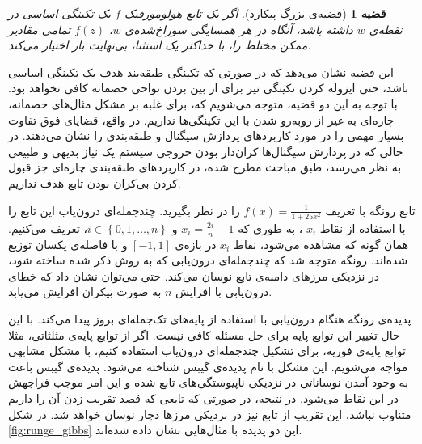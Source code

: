 \documentclass[12pt,onecolumn,a4paper]{article}
\newtheorem{theorem}{قضیه}[section]
\begin{document}
\begin{theorem}[قضیه‌ی بزرگ پیکارد]
    اگر یک تابع هولومورفیک $f$ 
    یک تکینگی اساسی در نقطه‌ی $w$ 
    داشته باشد، آنگاه در هر همسایگی سوراخ‌شده‌ی $w$، $f(z)$ 
    تمامی مقادیر ممکن مختلط را، با حداکثر یک استثنا، بی‌نهایت بار اختیار می‌کند.
\end{theorem}

این قضیه نشان می‌دهد که در صورتی که تکینگی طبقه‌بند هدف یک تکینگی اساسی باشد، حتی ایزوله کردن تکینگی نیز برای از بین بردن نواحی خصمانه کافی نخواهد بود. با توجه به این دو قضیه، متوجه می‌شویم که، برای غلبه بر مشکل مثال‌های خصمانه، چاره‌ای به غیر از روبه‌رو شدن با این تکینگی‌ها نداریم. در واقع، قضایای فوق تفاوت بسیار مهمی را در مورد کاربردهای پردازش سیگنال و طبقه‌بندی را نشان می‌دهند. در حالی که در پردازش سیگنال‌ها کران‌دار بودن خروجی سیستم یک نیاز بدیهی و طبیعی به نظر می‌رسد، طبق مباحث مطرح شده، در کاربردهای طبقه‌بندی چاره‌ای جز قبول کردن بی‌کران بودن تابع هدف نداریم. 

تابع رونگه با تعریف 
$f(x)=\frac{1}{1+25x^2}$ 
را در نظر بگیرید. چندجمله‌ای درون‌یاب این تابع را با استفاده از نقاط 
$x_i$ 
، به طوری که
$x_{i}=\frac{2i}{n}-1$ 
و 
$i\in \left\{0,1,\dots ,n\right\}$،
تعریف می‌کنیم.
همان گونه که مشاهده می‌شود، نقاط 
$x_i$ 
در بازه‌ی 
$[-1,1]$ 
و با فاصله‌ی یکسان توزیع شده‌اند. رونگه متوجه شد که چندجمله‌ای درون‌یابی که به روش ذکر شده ساخته شود، در نزدیکی مرز‌های دامنه‌ی تابع نوسان می‌کند. حتی می‌توان نشان داد که خطای درون‌یابی با افزایش 
$n$ 
 به صورت بیکران افرایش می‌یابد.

پدیده‌ی رونگه هنگام درون‌یابی با استفاده از پایه‌های تک‌جمله‌ای 
بروز پیدا می‌کند. با این حال تغییر این توابع پایه برای حل مسئله کافی نیست. اگر از توابع پایه‌ی مثلثاتی، مثلا توابع پایه‌ی فوریه، برای تشکیل چندجمله‌ای درون‌یاب استفاده کنیم، با مشکل مشابهی مواجه می‌شویم. این مشکل  با نام پدیده‌ی گیبس
شناخته می‌شود. پدیده‌ی گیبس باعث به وجود آمدن نوساناتی در نزدیکی ناپیوستگی‌های تابع شده و این امر موجب فراجهش
در این نقاط می‌شود. در نتیجه، در صورتی که تابعی که قصد تقریب زدن آن را داریم متناوب نباشد، این تقریب از تابع نیز در نزدیکی مرزها دچار نوسان خواهد شد. در شکل 
\ref{fig:runge_gibbs} 
این دو پدیده با مثال‌هایی نشان داده‌ شده‌اند.
\end{document}
